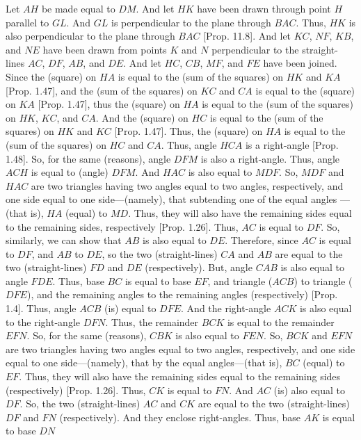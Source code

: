 \begin{Parallel}{}{}
{Let $AH$ be made equal to $DM$. And let $HK$ have been drawn through
point $H$ parallel to $GL$. And $GL$  is perpendicular to the plane
through $BAC$. Thus, $HK$  is also perpendicular to the plane through
$BAC$ [Prop. 11.8]. And let  $KC$, $NF$, $KB$, and $NE$ have
been drawn from points $K$ and $N$ perpendicular to the straight-lines $AC$, $DF$,
$AB$, and $DE$. And let $HC$, $CB$, $MF$, and $FE$ have
been joined. Since the (square) on $HA$ is equal to the (sum of the squares)
on $HK$ and $KA$ [Prop. 1.47], 
and the (sum of the squares) on $KC$ and $CA$ is equal to the (square) on $KA$   [Prop. 1.47], thus the  (square) on $HA$ is equal to the (sum
of the squares) on $HK$, $KC$, and $CA$. And the (square) on $HC$ is equal to the (sum of
the squares) on $HK$ and $KC$  [Prop. 1.47].
Thus, the (square) on $HA$ is equal to the (sum of the squares) on $HC$ and
$CA$. Thus, angle $HCA$ is a right-angle [Prop. 1.48]. So, for the same (reasons), angle $DFM$ is also
a right-angle. Thus, angle $ACH$ is equal to (angle) $DFM$. And $HAC$
is also equal to $MDF$.  So, $MDF$ and $HAC$
are two triangles
having two angles equal to two angles, respectively, and one side
equal to one side---(namely), that subtending one of the equal angles ---(that is), $HA$ (equal) to $MD$. 
Thus, they will also have the remaining sides equal to the remaining sides, respectively [Prop. 1.26]. Thus, $AC$ is equal to $DF$. So, similarly, we can show that $AB$ is also equal to $DE$. 
Therefore, since $AC$ is equal to $DF$, and $AB$ to $DE$, so the two
(straight-lines) $CA$ and $AB$ are equal to the two (straight-lines)
$FD$ and $DE$ (respectively). But, angle
$CAB$ is also equal to angle $FDE$. Thus, base $BC$ is equal to base
$EF$, and triangle ($ACB$) to triangle ($DFE$), and the remaining angles
to the remaining angles (respectively) [Prop. 1.4].
Thus, angle  $ACB$ (is) equal to $DFE$. And the right-angle $ACK$
is also equal to the right-angle $DFN$. Thus, the remainder
$BCK$ is equal to the remainder $EFN$. So, for the same (reasons), 
$CBK$ is also equal to $FEN$. So, $BCK$ and $EFN$
are two triangles having two angles equal to two angles, respectively, 
and one side equal to one side---(namely), that by the equal angles---(that is), $BC$ (equal) to $EF$. Thus, they will also have the remaining
sides equal to the remaining sides (respectively) [Prop. 1.26]. Thus, $CK$ is equal to $FN$. And $AC$ (is) also
equal to $DF$. So, the two (straight-lines) $AC$ and $CK$
are equal to the two (straight-lines) $DF$ and $FN$ (respectively). 
And they enclose right-angles. Thus, base $AK$ is equal to base $DN$
}
\end{Parallel}

